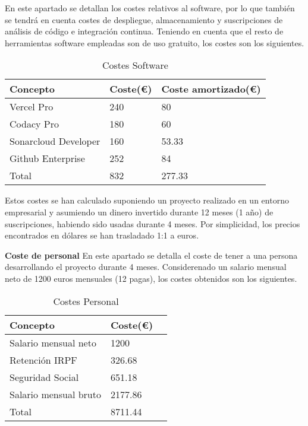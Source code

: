 En este apartado se detallan los costes relativos al software, por lo que también se tendrá en cuenta costes de despliegue, almacenamiento y suscripciones de análisis de código e integración continua. Teniendo en cuenta que el resto de herramientas software empleadas son de uso gratuito, los costes son los siguientes.
\begin{table}[H]
    \centering
    \begin{tabular}{@{}lll@{}}\toprule
         \textbf{Concepto} & \textbf{Coste(€)} & \textbf{Coste amortizado(€)} \\ \midrule
         Vercel Pro & 240 & 80\\
         Codacy Pro & 180 & 60\\
         Sonarcloud Developer & 160 & 53.33\\
         Github Enterprise & 252 & 84\\ \midrule
         Total & 832 & 277.33\\ \bottomrule
    \end{tabular}
    \caption{Costes Software}
    \label{ve:cost-soft}
\end{table}

Estos costes se han calculado suponiendo un proyecto realizado en un entorno empresarial y asumiendo un dinero invertido durante 12 meses (1 año) de suscripciones, habiendo sido usadas durante 4 meses. Por simplicidad, los precios encontrados en dólares se han trasladado 1:1 a euros.

\textbf{Coste de personal}
En este apartado se detalla el coste de tener a una persona desarrollando el proyecto durante 4 meses. Considerenado un salario mensual neto de 1200 euros mensuales (12 pagas), los costes obtenidos son los siguientes.
\begin{table}[H]
    \centering
    \begin{tabular}{@{}lll@{}}\toprule
         \textbf{Concepto }& \textbf{Coste(€)} \\ \midrule
         Salario mensual neto & 1200\\
         Retención IRPF & 326.68\\
         Seguridad Social & 651.18\\
         Salario mensual bruto & 2177.86\\ \midrule
         Total & 8711.44\\ \bottomrule
    \end{tabular}
    \caption{Costes Personal}
    \label{ve:cost-per}
\end{table}


